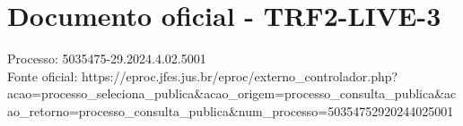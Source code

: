 \documentclass[12pt]{article}
\begin{document}
\section*{Documento oficial - TRF2-LIVE-3}
Processo: 5035475-29.2024.4.02.5001\\
Fonte oficial: https://eproc.jfes.jus.br/eproc/externo\_controlador.php?acao=processo\_seleciona\_publica\&acao\_origem=processo\_consulta\_publica\&acao\_retorno=processo\_consulta\_publica\&num\_processo=50354752920244025001\\
\end{document}
